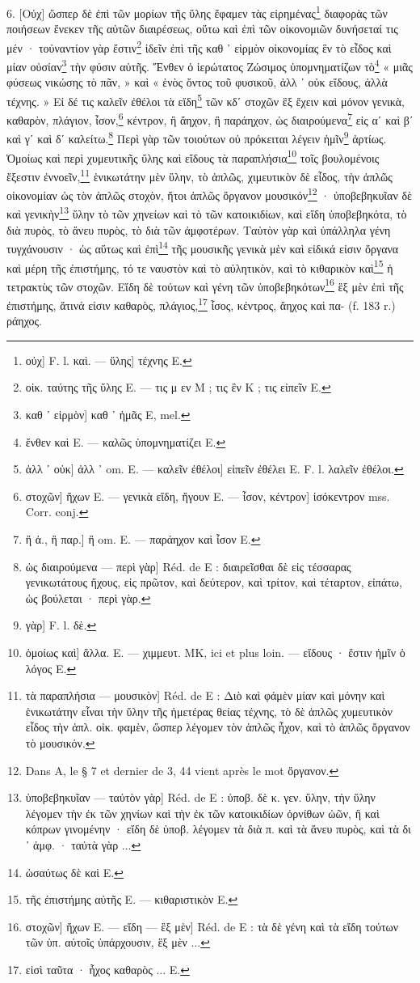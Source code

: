 \documentclass[a4paper, 11pt, oneside, polutonikogreek, french]{article}
\begin{document}
6. [Οὐχ] ὥσπερ δὲ ἐπὶ τῶν μορίων τῆς ὕλης ἔφαμεν τὰς εἰρημένας\footnote{οὐχ] F. l. καὶ. --- ὕλης] τέχνης E.} διαφορὰς τῶν ποιήσεων ἕνεκεν τῆς αὐτῶν διαιρέσεως, οὕτω καὶ ἐπὶ τῶν οἰκονομιῶν δυνήσεταί τις μέν · τοὐναντίον γὰρ ἔστιν\footnote{οἰκ. ταύτης τῆς ὕλης E. --- τις μ εν M ; τις ἓν K ; τις εἰπεῖν E.} ἰδεῖν ἐπὶ τῆς καθ ᾽ εἱρμὸν οἰκονομίας ἓν τὸ εἶδος καὶ μίαν οὐσίαν\footnote{καθ ᾽ εἱρμὸν] καθ ᾽ ἡμᾶς E, mel.} τὴν φύσιν αὐτῆς. Ἔνθεν ὁ ἱερώτατος Ζώσιμος ὑπομνηματίζων τὸ\footnote{ἔνθεν καὶ E. --- καλῶς ὑπομνηματίζει E.} « μιᾶς φύσεως νικώσης τὸ πᾶν, » καὶ « ἑνὸς ὄντος τοῦ φυσικοῦ, ἀλλ ᾽ οὐκ εἴδους, ἀλλὰ τέχνης. » Εἰ δέ τις καλεῖν ἐθέλοι τὰ εἴδη\footnote{ἀλλ ᾽ οὐκ] ἀλλ ᾽ om. E. --- καλεῖν ἐθέλοι] εἰπεῖν ἐθέλει E. F. l. λαλεῖν ἐθέλοι.} τῶν κδʹ στοχῶν ἓξ ἔχειν καὶ μόνον γενικὰ, καθαρὸν, πλάγιον, ἶσον,\footnote{στοχῶν] ἤχων E. --- γενικὰ εἴδη, ἤγουν E. --- ἶσον, κέντρον] ἰσόκεντρον mss. Corr. conj.} κέντρον, ἢ ἄηχον, ἢ παράηχον, ὡς διαιρούμενα\footnote{ἢ ἀ., ἢ παρ.] ἢ om. E. --- παράηχον καὶ ἶσον E.} εἰς αʹ καὶ βʹ καὶ γʹ καὶ δʹ καλείτω.\footnote{ὡς διαιρούμενα --- περὶ γὰρ] Réd. de E : διαιρεῖσθαι δὲ εἰς τέσσαρας γενικωτάτους ἤχους, εἰς πρῶτον, καὶ δεύτερον, καὶ τρίτον, καὶ τέταρτον, εἰπάτω, ὡς βούλεται · περὶ γὰρ.} Περὶ γὰρ τῶν τοιούτων οὐ πρόκειται λέγειν ἡμῖν\footnote{γὰρ] F. l. δὲ.} ἀρτίως. Ὁμοίως καὶ περὶ χυμευτικῆς ὔλης καὶ εἴδους τὰ παραπλήσια\footnote{ὁμοίως καὶ] ἄλλα. E. --- χιμμευτ. MK, ici et plus loin. --- εἴδους · ἔστιν ἡμῖν ὁ λόγος E.} τοῖς βουλομένοις ἔξεστιν ἐννοεῖν,\footnote{τὰ παραπλήσια --- μουσικὸν] Réd. de E : Διὸ καὶ φάμὲν μίαν καὶ μόνην καὶ ἑνικωτάτην εἶναι τὴν ὕλην τῆς ἡμετέρας θείας τέχνης, τὸ δὲ ἁπλῶς χυμευτικὸν εἶδος τὴν ἁπλ. οἰκ. φαμὲν, ὥσπερ λέγομεν τὸν ἁπλῶς ἦχον, καὶ τὸ ἁπλῶς ὄργανον τὸ μουσικόν.} ἑνικωτάτην μὲν ὕλην, τὸ ἁπλῶς, χιμευτικὸν δὲ εἶδος, τὴν ἁπλῶς οἰκονομίαν ὡς τὸν ἁπλῶς στοχὸν, ἤτοι ἀπλῶς ὄργανον μουσικόν\footnote{Dans A, le § 7 et dernier de 3, 44 vient après le mot ὄργανον.} · ὑποβεβηκυῖαν δὲ καὶ γενικὴν\footnote{ὑποβεβηκυῖαν --- ταὐτὸν γὰρ] Réd. de E : ὑποβ. δὲ κ. γεν. ὕλην, τὴν ὕλην λέγομεν τὴν ἐκ τῶν χηνίων καὶ τὴν ἐκ τῶν κατοικιδίων ὀρνίθων ὠῶν, ἢ καὶ κόπρων γινομένην · εἴδη δὲ ὑποβ. λέγομεν τὰ διὰ π. καὶ τὰ ἄνευ πυρὸς, καὶ τὰ δι ᾽ ἀμφ. · ταὐτὰ γὰρ ...} ὕλην τὸ τῶν χηνείων καὶ τὸ τῶν κατοικιδίων, καὶ εἴδη ὑποβεβηκότα, τὸ διὰ πυρὸς, τὸ ἄνευ πυρὸς, τὸ διὰ τῶν ἀμφοτέρων. Ταὐτὸν γὰρ καὶ ὑπάλληλα γένη τυγχάνουσιν · ὡς αὕτως καὶ ἐπὶ\footnote{ὡσαύτως δὲ καὶ E.} τῆς μουσικῆς γενικὰ μὲν καὶ εἰδικά εἰσιν ὄργανα καὶ μέρη τῆς ἐπιστήμης, τό τε ναυστὸν καὶ τὸ αὐλητικὸν, καὶ τὸ κιθαρικὸν καὶ\footnote{τῆς ἐπιστήμης αὐτῆς E. --- κιθαριστικὸν E.} ἡ τετρακτὺς τῶν στοχῶν. Εἴδη δὲ τούτων καὶ γένη τῶν ὑποβεβηκότων\footnote{στοχῶν] ἤχων E. --- εἴδη --- ἓξ μὲν] Réd. de E : τὰ δὲ γένη καὶ τὰ εἴδη τούτων τῶν ὑπ. αὐτοῖς ὑπάρχουσιν, ἓξ μὲν ...} ἓξ μὲν ἐπὶ τῆς ἐπιστήμης, ἅτινά εἰσιν καθαρὸς, πλάγιος,\footnote{εἰσὶ ταῦτα · ἦχος καθαρὸς ... E.} ἶσος, κέντρος, ἄηχος καὶ πα- (f. 183 r.) ράηχος.
\end{document}
